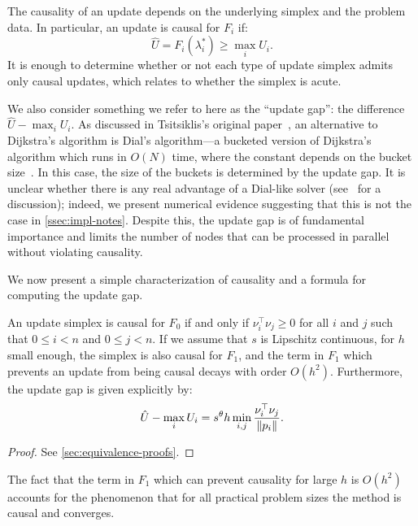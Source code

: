 \documentclass[sisc-eikonal.tex]{subfiles}
\begin{document}
The causality of an update depends on the underlying simplex and the
problem data. In particular, an update is causal for $F_i$ if:
\begin{equation}
  \hat{U} = F_i(\lambda_i^*) \geq \max_i U_i.
\end{equation}
It is enough to determine whether or not each type of update simplex
admits only causal updates, which relates to whether the simplex is
acute.

We also consider something we refer to here as the ``update gap'': the
difference $\hat{U} - \max_i U_i$. As discussed in Tsitsiklis's
original paper~\cite{tsitsiklis1995efficient}, an alternative to
Dijkstra's algorithm is Dial's algorithm---a bucketed version of
Dijkstra's algorithm which runs in $O(N)$ time, where the constant
depends on the bucket size~\cite{dial1969algorithm,kim2001calo}. In
this case, the size of the buckets is determined by the update gap. It
is unclear whether there is any real advantage of a Dial-like solver
(see~\cite{jeong2008fast} for a discussion); indeed, we present
numerical evidence suggesting that this is not the case in
\cref{ssec:impl-notes}. Despite this, the update gap is of fundamental
importance and limits the number of nodes that can be processed in
parallel without violating causality.

We now present a simple characterization of causality and a formula
for computing the update gap.
\begin{theorem}\label{thm:causality}
  An update simplex is causal for $F_0$ if and only if
  $\nu_i^\top \nu_j \geq 0$ for all $i$ and $j$ such that
  $0 \leq i < n$ and $0 \leq j < n$. If we assume that $s$ is
  Lipschitz continuous, for $h$ small enough, the simplex is also
  causal for $F_1$, and the term in $F_1$ which prevents an update
  from being causal decays with order $O(h^2)$. Furthermore, the
  update gap is given explicitly by:
  \begin{equation}
    \hat{U} - \max_i U_i = s^\theta h \min_{i, j} \frac{\nu_i^\top \nu_j}{\left\|p_i\right\|}.
  \end{equation}
\end{theorem}

\begin{proof}
  See \cref{sec:equivalence-proofs}.
\end{proof}

\noindent The fact that the term in $F_1$ which can prevent causality
for large $h$ is $O(h^2)$ accounts for the phenomenon that for all
practical problem sizes the method is causal and converges.
\end{document}
